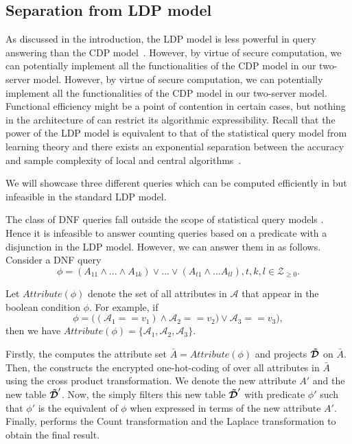 \subsection{Separation from LDP model}\label{app:sepldp}
As discussed in the introduction, the \textsf{LDP} model is less powerful in query answering than the \textsf{CDP} model~\cite{Kasivi,mixnets}. However, by virtue of secure computation, we can potentially implement all the functionalities of the \textsf{CDP} model in our two-server model. However, by virtue of secure computation, we can potentially implement all the functionalities of the \textsf{CDP} model in our two-server model. Functional efficiency might be a point of contention in certain cases, but nothing in the architecture of  \system can restrict its algorithmic expressibility. Recall that the power of the \textsf{LDP} model is equivalent to that of the statistical query model \cite{SQ1} from learning theory and there exists an exponential separation between the accuracy and sample complexity of local and central algorithms~\cite{Kasivi}.

We will showcase three different queries which can be computed efficiently in \system but infeasible in the standard \textsf{LDP} model.

The class of DNF queries fall outside the scope of statistical query models \cite{DNF}. Hence it is infeasible to answer counting queries based on a predicate with a disjunction in the \textsf{LDP} model. However, we can answer them in \system as follows.
Consider a DNF query 
$$\phi = (A_{11}\land ...\land A_{1k}) \vee ... \vee (A_{t1}\land ... A_{tl}), t, k,l \in \mathcal{Z}_{\geq 0}.$$

Let $Attribute(\phi)$ denote the set of all attributes in $\mathcal{A}$ that appear in the boolean condition $\phi$. For example, if $$\phi = \big((\mathcal{A}_1==v_1) \land \mathcal{A}_2==v_2) \vee \mathcal{A}_3==v_3 \big),$$ then we have $Attribute(\phi)=\{\mathcal{A}_1, \mathcal{A}_2,\mathcal{A}_3\}$.

Firstly, the \AS computes the attribute set $\bar{A}=Attribute(\phi)$ and projects $\boldsymbol{\tilde{\mathcal{D}}}$ on $\bar{A}$. Then, the \AS constructs the encrypted one-hot-coding of over all attributes in $\bar{A}$ using the cross product transformation. We denote the new attribute $A'$ and the new table $\boldsymbol{\tilde{\mathcal{D}}}'$. Now, the \AS simply filters this new table $\boldsymbol{\tilde{\mathcal{D}}}'$ with predicate $\phi'$  such that $\phi'$ is the equivalent of $\phi$ when expressed in terms of the new  attribute $A'$. Finally, \AS  performs the \textsf{Count} transformation and the \textsf{Laplace} transformation to obtain the final result.

